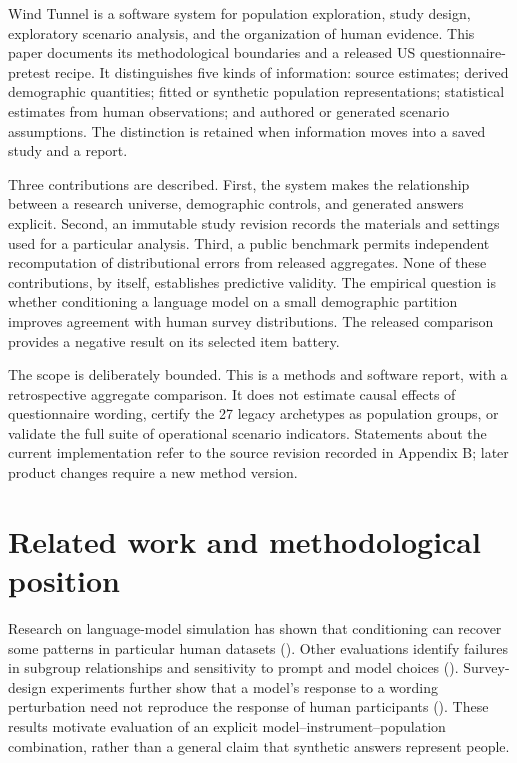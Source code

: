 \documentclass[
  11pt,
]{article}
\let\originalsection\section
\renewcommand{\section}{\Needspace{5\baselineskip}\originalsection}
\begin{document}
Wind Tunnel is a software system for population exploration, study
design, exploratory scenario analysis, and the organization of human
evidence. This paper documents its methodological boundaries and a
released US questionnaire-pretest recipe. It distinguishes five kinds of
information: source estimates; derived demographic quantities; fitted or
synthetic population representations; statistical estimates from human
observations; and authored or generated scenario assumptions. The
distinction is retained when information moves into a saved study and a
report.

Three contributions are described. First, the system makes the
relationship between a research universe, demographic controls, and
generated answers explicit. Second, an immutable study revision records
the materials and settings used for a particular analysis. Third, a
public benchmark permits independent recomputation of distributional
errors from released aggregates. None of these contributions, by itself,
establishes predictive validity. The empirical question is whether
conditioning a language model on a small demographic partition improves
agreement with human survey distributions. The released comparison
provides a negative result on its selected item battery.

The scope is deliberately bounded. This is a methods and software
report, with a retrospective aggregate comparison. It does not estimate
causal effects of questionnaire wording, certify the 27 legacy
archetypes as population groups, or validate the full suite of
operational scenario indicators. Statements about the current
implementation refer to the source revision recorded in Appendix B;
later product changes require a new method version.

\section{Related work and methodological
position}\label{related-work-and-methodological-position}

Research on language-model simulation has shown that conditioning can
recover some patterns in particular human datasets
(). Other evaluations
identify failures in subgroup relationships and sensitivity to prompt
and model choices ().
Survey-design experiments further show that a model's response to a
wording perturbation need not reproduce the response of human
participants (). These
results motivate evaluation of an explicit model--instrument--population
combination, rather than a general claim that synthetic answers
represent people.
\end{document}
